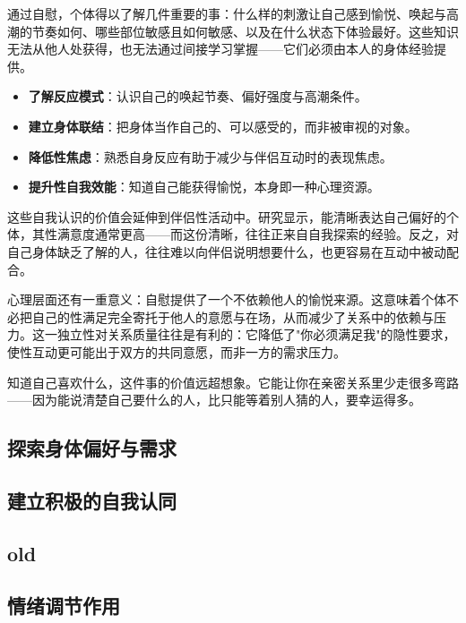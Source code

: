 \documentclass[12pt,UTF8]{ctexbook}
\newcommand{\keyword}[1]{\textbf{#1}}
\begin{document}
通过自慰，个体得以了解几件重要的事：什么样的刺激让自己感到愉悦、唤起与高潮的节奏如何、哪些部位敏感且如何敏感、以及在什么状态下体验最好。这些知识无法从他人处获得，也无法通过间接学习掌握——它们必须由本人的身体经验提供。

\begin{itemize}
	\item \keyword{了解反应模式}：认识自己的唤起节奏、偏好强度与高潮条件。
	\item \keyword{建立身体联结}：把身体当作自己的、可以感受的，而非被审视的对象。
	\item \keyword{降低性焦虑}：熟悉自身反应有助于减少与伴侣互动时的表现焦虑。
	\item \keyword{提升性自我效能}：知道自己能获得愉悦，本身即一种心理资源。
\end{itemize}

这些自我认识的价值会延伸到伴侣性活动中。研究显示，能清晰表达自己偏好的个体，其性满意度通常更高——而这份清晰，往往正来自自我探索的经验。反之，对自己身体缺乏了解的人，往往难以向伴侣说明想要什么，也更容易在互动中被动配合。

心理层面还有一重意义：自慰提供了一个不依赖他人的愉悦来源。这意味着个体不必把自己的性满足完全寄托于他人的意愿与在场，从而减少了关系中的依赖与压力。这一独立性对关系质量往往是有利的：它降低了"你必须满足我"的隐性要求，使性互动更可能出于双方的共同意愿，而非一方的需求压力。

\begin{tcolorbox}[colback=pink!5!white,colframe=red!50!black,title=贴心小叮咛]
	知道自己喜欢什么，这件事的价值远超想象。它能让你在亲密关系里少走很多弯路——因为能说清楚自己要什么的人，比只能等着别人猜的人，要幸运得多。
\end{tcolorbox}

\subsection{探索身体偏好与需求}

\subsection{建立积极的自我认同}

\subsection{old}
\subsection{情绪调节作用}
\end{document}
